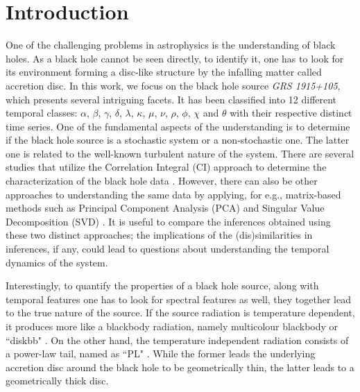 \documentclass[10pt,conference]{IEEEtran}
\begin{document}
\section{Introduction}
One of the challenging problems in astrophysics is the understanding of black holes. As a black hole cannot be seen directly, to identify it, one has to look for its environment forming a disc-like structure by the infalling matter called accretion disc. In this work, we focus on the black hole source \textit{GRS 1915+105}, which presents several intriguing facets. It has been classified into 12 different temporal classes: $\alpha$, $\beta$, $\gamma$, $\delta$, $\lambda$, $\kappa$, $\mu$, $\nu$, $\rho$, $\phi$, $\chi$ and $\theta$ \cite{Belloni2000} with their respective distinct time series. One of the fundamental aspects of the understanding is to determine if the black hole source is a stochastic system or a non-stochastic one. The latter one is related to the well-known turbulent nature of the system. There are several studies that utilize the Correlation Integral (CI) approach to determine the characterization of the black hole data \cite{Mukhopadhyay2004, misra2006}. However, there can also be other approaches to understanding the same data by applying, for e.g.,  matrix-based methods such as Principal Component Analysis (PCA) and Singular Value Decomposition (SVD) . It is useful to compare the inferences obtained using these two distinct approaches; the implications of the (dis)similarities in inferences, if any, could lead to questions about understanding the temporal dynamics of the system.

Interestingly, to quantify the properties of a black hole source, along with temporal features one has to look for spectral features as well, they together lead to the true nature of the source. If the source radiation is temperature dependent, it produces more like a blackbody radiation, namely multicolour blackbody or ``diskbb" \cite{Shakura1973}. On the other hand, the temperature independent radiation consists of a power-law tail, named as ``PL" \cite{chakrabarti1995,narayan1994}. While the former leads the underlying accretion disc around the black hole to be geometrically thin, the latter leads to a geometrically thick disc.
\end{document}
